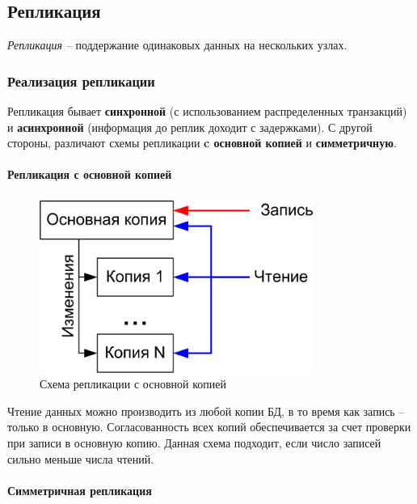 \subsection{Репликация}

\begin{definition}
    \textit{Репликация} -- поддержание одинаковых данных на нескольких узлах.
\end{definition}

\subsubsection{Реализация репликации}

Репликация бывает \textbf{синхронной} (с использованием распределенных транзакций) и
\textbf{асинхронной} (информация до реплик доходит с задержками). С другой стороны, различают схемы
репликации \textbf{c основной копией} и \textbf{симметричную}.

\paragraph{Репликация с основной копией}

\begin{figure}[h]
    \centering
    \includegraphics[width=0.8\textwidth]{../assets/kgeorgiy/distributed/Replication_Master.png}
    \caption{Схема репликации с основной копией}
    \label{repl-master}
\end{figure}

Чтение данных можно производить из любой копии БД, в то время как запись -- только в основную.
Согласованность всех копий обеспечивается за счет проверки при записи в основную копию. Данная
схема подходит, если число записей сильно меньше числа чтений.

\paragraph{Симметричная репликация}

